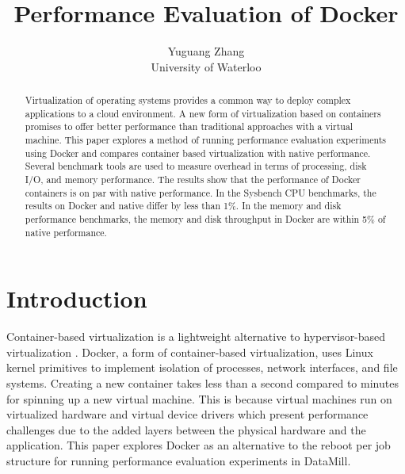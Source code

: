 \documentclass[11pt]{article}
\begin{document}
	
	\thispagestyle{empty}
	
	\title{Performance Evaluation of Docker}
	
	\author{Yuguang Zhang \\ University of Waterloo}
	
	\maketitle
	
	
	\begin{abstract}
		Virtualization of operating systems provides a common way to deploy complex
		applications to a cloud environment. A new form of virtualization based on containers
		promises to offer better performance than traditional approaches with a virtual machine.
		This paper explores a method of running performance evaluation experiments using
		Docker and compares container based virtualization with native performance. Several
		benchmark tools are used to measure overhead in terms of processing, disk I/O,
		and memory performance. The results show that the performance of Docker containers is on par with native performance. In the Sysbench CPU benchmarks, the results on Docker and native differ by less than 1\%. In the memory and disk performance benchmarks, the memory and disk throughput in Docker are within 5\% of native performance.
	\end{abstract}
	
	\section{Introduction}
	Container-based virtualization is a lightweight alternative to hypervisor-based virtualization \cite{morabito}. Docker, a form of container-based virtualization, uses Linux kernel primitives to implement isolation of processes, network interfaces, and file systems. Creating a new container takes less than a second compared to minutes for spinning up a new virtual machine. This is because virtual machines run on virtualized hardware and virtual device drivers which present performance challenges due to the added layers between the physical hardware and the application. This paper explores Docker as an alternative to the reboot per job structure for running performance evaluation experiments in DataMill.
	
\end{document}
